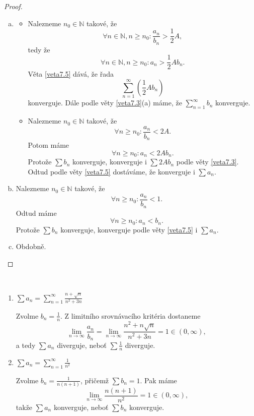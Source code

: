 \begin{proof}
	\,
	\begin{enumerate}[(a)]
		\item
		\begin{itemize}
			\item[$\implies$]
			Nalezneme $n_0 \in \mathbb N $ takové, že
			$$\forall n \in \mathbb N , n \geq n_0 : \frac{a_n}{b_n} > \frac{1}{2}A,$$
			tedy že
			$$
			    \forall n \in \mathbb N , n \geq n_0 : a_n > \frac{1}{2}A b_n.
			$$
			Věta \ref{veta7.5} dává, že řada
			$$
			    \sum_{n=1}^\infty \left( \frac{1}{2}Ab_n \right )
			$$
			konverguje. Dále podle věty \ref{veta7.3}(a) máme, že
			$
			    \sum_{n=1}^\infty b_n
			$
			konverguje.
			\item[$\impliedby$] Nalezneme $n_0 \in \mathbb N $ takové, že
			$$
			    \forall n  \geq n_0: \frac{a_n}{b_n} < 2A.
			$$
			Potom máme
			$$
			    \forall n \geq n_0: a_n < 2Ab_n.
			$$
			Protože $\sum b_n$ konverguje, konverguje i $\sum 2Ab_n$
			podle věty \ref{veta7.3}. Odtud podle věty \ref{veta7.5} dostáváme,
			že konverguje i $\sum a_n$.
		\end{itemize}
		\item Nalezneme $n_0 \in \mathbb N $ takové, že
		$$
		    \forall n \geq n_0: \frac{a_n}{b_n} < 1.
		$$
		Odtud máme
		$$
		    \forall n \geq n_0: a_n < b_n.
		$$
		Protože $\sum b_n$ konverguje, konverguje podle věty \ref{veta7.5} i $\sum a_n$.
		\item Obdobně. \qedhere
	\end{enumerate}
\end{proof}

\begin{priklad}\,
\begin{enumerate}[(1)]
	\item $\sum a_n=\sum_{n=1}^\infty \frac{n+ \sqrt{n}}{n^2+3n}$
	\par Zvolme $b_n = \frac{1}{n}$. Z limitního srovnávacího kritéria dostaneme
	$$
 \lim_{n \to \infty} \frac{a_n}{b_n} = \lim_{n \to \infty} \frac{n^2+n \sqrt{n}}{n^2+3n} = 1 \in (0,\infty),
	$$
	a tedy $\sum a_n$ diverguje, neboť $\sum \frac{1}{n}$ diverguje.
	\item $\sum a_n=\sum_{n=1}^\infty \frac{1}{n^2}$
	\par Zvolme $b_n = \frac{1}{n(n+1)}$, přičemž $\sum b_n = 1$. Pak máme
	$$
 \lim_{n \to \infty} \frac{n(n+1)}{n^2} = 1 \in (0,\infty),
	$$
	takže $\sum a_n$ konverguje, neboť $\sum b_n$ konverguje.
\end{enumerate}
\end{priklad}

